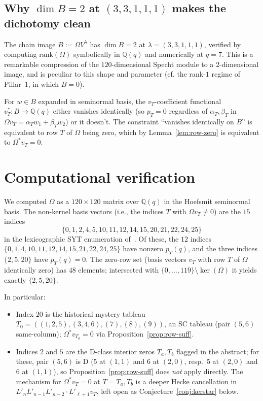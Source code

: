 \documentclass[11pt]{article}
\theoremstyle{definition}
\newcommand{\Vlam}{V^\lambda}
\newcommand{\Om}{\Omega}
\newcommand{\Omstar}{\Omega^{\ast}}
\newcommand{\Lp}{{L'}}
\newcommand{\pT}{p_T}
\newcommand{\rk}{\mathrm{rank}}
\begin{document}
\subsection{Why $\dim B = 2$ at $(3,3,1,1,1)$ makes the dichotomy clean}

The chain image $B := \Om\Vlam$ has $\dim B = 2$ at $\lambda = (3,3,1,1,1)$,
verified by computing $\rk(\Om)$ symbolically in $\mathbb{Q}(q)$ and
numerically at $q = 7$. This is a remarkable compression of the
$120$-dimensional Specht module to a $2$-dimensional image, and is
peculiar to this shape and parameter (cf. the rank-$1$ regime of
Pillar~1, in which $B = 0$).

For $w \in B$ expanded in seminormal basis, the $v_T$-coefficient
functional $v_T^\ast: B \to \mathbb{Q}(q)$ either vanishes
identically (so $\pT = 0$ regardless of $\alpha_T, \beta_T$ in
$\Om v_T = \alpha_T w_1 + \beta_T w_2$) or it doesn't. The constraint
``vanishes identically on $B$'' is equivalent to row $T$ of $\Om$ being
zero, which by Lemma~\ref{lem:row-zero} is equivalent to $\Omstar v_T = 0$.

\section{Computational verification}\label{sec:compute}

We computed $\Om$ as a $120 \times 120$ matrix over $\mathbb{Q}(q)$ in the
Hoefsmit seminormal basis. The non-kernel basis vectors (i.e., the indices
$T$ with $\Om v_T \neq 0$) are the $15$ indices
\[
   \{0, 1, 2, 4, 5, 10, 11, 12, 14, 15, 20, 21, 22, 24, 25\}
\]
in the lexicographic SYT enumeration of~\cite[\texttt{syt\_of\_shape}]{verifyConv}.
Of these, the $12$ indices
$\{0, 1, 4, 10, 11, 12, 14, 15, 21, 22, 24, 25\}$ have nonzero
$\pT(q)$, and the three indices $\{2, 5, 20\}$ have $\pT(q) = 0$. The
zero-row set (basis vectors $v_T$ with row $T$ of $\Om$ identically zero)
has $48$ elements; intersected with $\{0,\ldots,119\} \setminus \ker(\Om)$
it yields exactly $\{2, 5, 20\}$.

In particular:
\begin{itemize}[topsep=0.2em,itemsep=0.1em]
\item Index $20$ is the historical mystery tableau
   $T_0 = ((1,2,5),(3,4,6),(7),(8),(9))$, an SC tableau (pair $(5,6)$
   same-column); $\Omstar v_{T_0} = 0$ via
   Proposition~\ref{prop:row-suff}.
\item Indices $2$ and $5$ are the D-class interior zeros
   $T_a, T_b$ flagged in the abstract; for these, pair $(5,6)$ is
   D (5 at $(1,1)$ and $6$ at $(2,0)$, resp.\ 5 at $(2,0)$ and $6$ at
   $(1,1)$), so Proposition~\ref{prop:row-suff} does \emph{not} apply
   directly. The mechanism for $\Omstar v_T = 0$ at $T = T_a, T_b$ is a
   deeper Hecke cancellation in $\Lp_n \Lp_{n-1} \Lp_{n-2} \cdot \Lp_{\ell+1} v_T$,
   left open as Conjecture~\ref{conj:kerstar} below.
\end{itemize}
\end{document}
